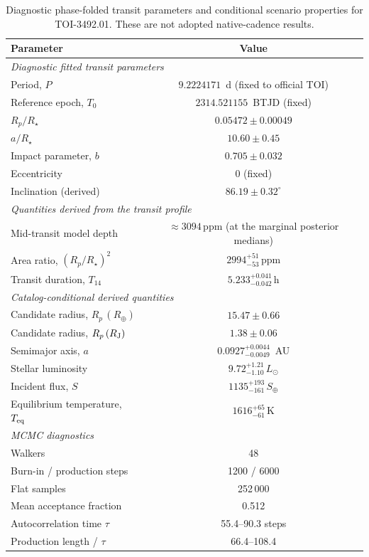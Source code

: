 \documentclass[11pt]{article}
\begin{document}
\begin{table}[ht]
\centering
\caption{Diagnostic phase-folded transit parameters and conditional scenario
  properties for TOI-3492.01.  These are not adopted native-cadence results.}
\label{tab:planet}
\renewcommand{\arraystretch}{1.16}
\begin{tabular}{lc}
\toprule
Parameter & Value \\
\midrule
\multicolumn{2}{l}{\textit{Diagnostic fitted transit parameters}} \\[2pt]
Period, $P$                 & $9.2224171$~d (fixed to official TOI) \\
Reference epoch, $T_0$      & $2314.521155$~BTJD (fixed) \\
$R_p/R_\star$               & $0.05472 \pm 0.00049$ \\
$a/R_\star$                 & $10.60 \pm 0.45$ \\
Impact parameter, $b$       & $0.705 \pm 0.032$ \\
Eccentricity                & $0$ (fixed) \\
Inclination (derived)       & $86.19 \pm 0.32^\circ$ \\[4pt]
\multicolumn{2}{l}{\textit{Quantities derived from the transit profile}} \\[2pt]
Mid-transit model depth     & $\approx3094\,\mathrm{ppm}$ (at the marginal posterior medians) \\
Area ratio, $(R_p/R_\star)^2$ & $2994^{+51}_{-53}\,\mathrm{ppm}$ \\
Transit duration, $T_{14}$  & $5.233^{+0.041}_{-0.042}\,\mathrm{h}$ \\[6pt]
\multicolumn{2}{l}{\textit{Catalog-conditional derived quantities}} \\[2pt]
Candidate radius, $R_p\,(R_\oplus)$ & $15.47 \pm 0.66$ \\
Candidate radius, $R_p\,(R_{\rm J})$ & $1.38 \pm 0.06$ \\
Semimajor axis, $a$         & $0.0927^{+0.0044}_{-0.0049}$~AU \\
Stellar luminosity          & $9.72^{+1.21}_{-1.10}\,L_\odot$ \\
Incident flux, $S$          & $1135^{+193}_{-161}\,S_\oplus$ \\
Equilibrium temperature, $T_{\rm eq}$ & $1616^{+65}_{-61}\,\mathrm{K}$ \\[6pt]
\multicolumn{2}{l}{\textit{MCMC diagnostics}} \\[2pt]
Walkers                     & 48 \\
Burn-in / production steps  & 1200 / 6000 \\
Flat samples                & 252\,000 \\
Mean acceptance fraction    & 0.512 \\
Autocorrelation time $\tau$ & 55.4--90.3 steps \\
Production length / $\tau$  & 66.4--108.4 \\
\bottomrule
\end{tabular}
\renewcommand{\arraystretch}{1}
\end{table}
\end{document}
